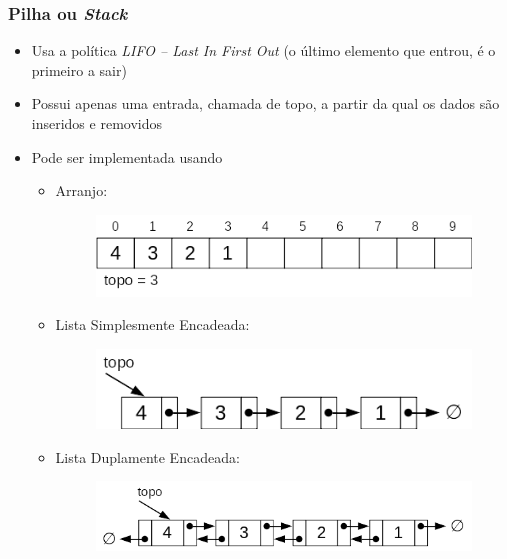 \documentclass[aspectratio=169]{beamer}
\begin{document}
\begin{frame}\frametitle{Pilha ou \emph{Stack}}
\begin{itemize}
	\item Usa a política \emph{LIFO -- Last In First Out} (o último elemento que entrou, é o primeiro a sair)
	\item Possui apenas uma entrada, chamada de topo, a partir da qual os dados são inseridos e removidos
	\item Pode ser implementada usando
	\begin{itemize}
		\item Arranjo:
\begin{figure}[h]
	\flushleft
	\includegraphics[height=0.11\paperheight]{imagens/pilha1.png}
\end{figure}
		\item Lista Simplesmente Encadeada:
\begin{figure}[h]
	\flushleft
	\includegraphics[height=0.12\paperheight]{imagens/pilha2.png}
\end{figure}
		\item Lista Duplamente Encadeada:
\begin{figure}[h]
	\flushleft
	\includegraphics[height=0.12\paperheight]{imagens/pilha3.png}
\end{figure}
	\end{itemize}
\end{itemize}
\end{frame}
\end{document}
